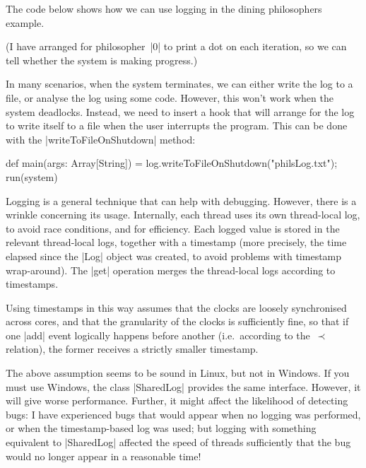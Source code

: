 The code below shows how we can use logging in the dining philosophers
example.
%
%
(I have arranged for philosopher~|0| to print a dot on each iteration, so we
can tell whether the system is making progress.)

In many scenarios, when the system terminates, we can either write the log to
a file, or analyse the log using some code.  However, this won't work when the
system deadlocks.  Instead, we need to insert a hook that will arrange for the
log to write itself to a file when the user interrupts the program.  This can
be done with the |writeToFileOnShutdown| method:
%
\begin{scala}
  def main(args: Array[String]) = {
    log.writeToFileOnShutdown("philsLog.txt"); run(system)
  }
\end{scala}

Logging is a general technique that can help with debugging.  However, there
is a wrinkle concerning its usage.
%
Internally, each thread uses its own thread-local log, to avoid race
conditions, and for efficiency.  Each logged value is stored in the relevant
thread-local logs, together with a timestamp (more precisely, the time elapsed
since the |Log| object was created, to avoid problems with timestamp
wrap-around).
%
The |get| operation merges the thread-local logs according to
timestamps.

Using timestamps in this way assumes that the clocks are loosely synchronised
across cores, and that the granularity of the clocks is sufficiently fine, so
that if one |add| event logically happens before another (i.e.~according to
the~$\prec$ relation), the former receives a strictly smaller timestamp.

The above assumption seems to be sound in Linux, but not in Windows.  If you
must use Windows, the class |SharedLog| provides the same interface.  However,
it will give worse performance.  Further, it might affect the likelihood of
detecting bugs: I have experienced bugs that would appear when no logging was
performed, or when the timestamp-based log was used; but logging with
something equivalent to |SharedLog| affected the speed of threads sufficiently
that the bug would no longer appear in a reasonable time!


